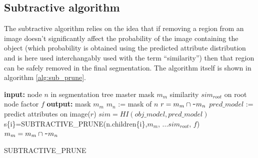 \documentclass[10pt,twocolumn,letterpaper]{article}
\begin{document}
\subsection{Subtractive algorithm}

The subtractive algorithm relies on the idea that if removing a region from
an image doesn't significantly affect the probability of the image containing
the object (which probability is obtained using the predicted attribute
distribution and is here used interchangably used with the term ``similarity'')
then that region can be safely removed in the final segmentation.
The algorithm itself is shown in algorithm \ref{alg:sub_prune}.

\begin{algorithm}
\begin{algorithmic}
  \STATE \textbf{input:}
  \STATE \hspace{3 mm} node $n$ in segmentation tree
  \STATE \hspace{3 mm} master mask $m_m$
  \STATE \hspace{3 mm} similarity $sim_{root}$ on root node
  \STATE \hspace{3 mm} factor $f$
  \STATE \textbf{output:}
  \STATE \hspace{3 mm} mask $m_m$
  \STATE
  \STATE $m_n$ := mask of $n$
  \STATE $r = m_{m} \cap \verb+~+ m_{n}$
  \STATE $pred\_model$ := predict attributes on image($r$)
  \STATE $sim=HI(obj\_model,pred\_model)$
      \STATE s\{i\}=SUBTRACTIVE\_PRUNE(n.children\{i\},$m_m$,
      \STATE ...$sim_{root}$, $f$)
    \ENDFOR
  \ELSE
    \STATE $m_m = m_m \cap \verb+~+ m_n$
  \ENDIF
\end{algorithmic}
\caption{SUBTRACTIVE\_PRUNE}
\label{alg:sub_prune}
\end{algorithm}
\end{document}
